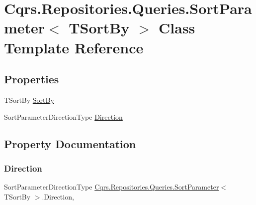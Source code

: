 \hypertarget{classCqrs_1_1Repositories_1_1Queries_1_1SortParameter}{}\section{Cqrs.\+Repositories.\+Queries.\+Sort\+Parameter$<$ T\+Sort\+By $>$ Class Template Reference}
\label{classCqrs_1_1Repositories_1_1Queries_1_1SortParameter}
\subsection*{Properties}
\begin{DoxyCompactItemize}
\item 
T\+Sort\+By \hyperlink{classCqrs_1_1Repositories_1_1Queries_1_1SortParameter_adcd8ebe48bfc697ada8b302d5acb3d00}{Sort\+By}
\item 
Sort\+Parameter\+Direction\+Type \hyperlink{classCqrs_1_1Repositories_1_1Queries_1_1SortParameter_abbe43d8ab36bb92bc388ad72651db73f}{Direction}
\end{DoxyCompactItemize}


\subsection{Property Documentation}
\mbox{\label{classCqrs_1_1Repositories_1_1Queries_1_1SortParameter_abbe43d8ab36bb92bc388ad72651db73f}} 
\subsubsection{\texorpdfstring{Direction}{Direction}}
{\footnotesize\ttfamily Sort\+Parameter\+Direction\+Type \hyperlink{classCqrs_1_1Repositories_1_1Queries_1_1SortParameter}{Cqrs.\+Repositories.\+Queries.\+Sort\+Parameter}$<$ T\+Sort\+By $>$.Direction\hspace{0.3cm}{\ttfamily [get]}, {\ttfamily [set]}}


